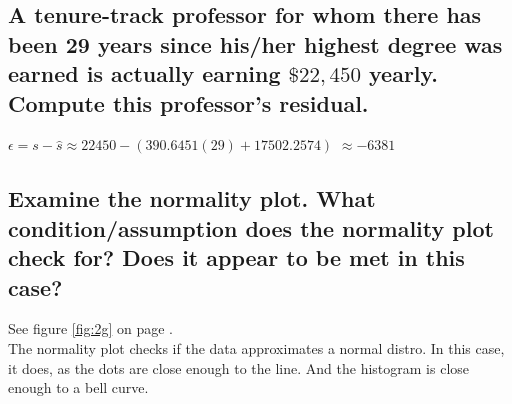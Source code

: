 \begin{multicols}{2}
        \subsection{A tenure-track professor for whom there has been 29 years since his/her highest
            degree was earned is actually earning $\$22,450$ yearly. Compute this professor’s
            residual.}
            $\epsilon = s - \hat s \approx 22450 - (390.6451(29) + 17502.2574)$
            $\approx -6381$
            
        \subsection{Examine the normality plot. What condition/assumption does the normality plot check for?
            Does it appear to be met in this case?}
            See figure \ref{fig:2g} on page \pageref{fig:2g}.\\
            The normality plot checks if the data approximates a normal distro.
            In this case, it does, as the dots are close enough to the line.
            And the histogram is close enough to a bell curve.
    \end{multicols}